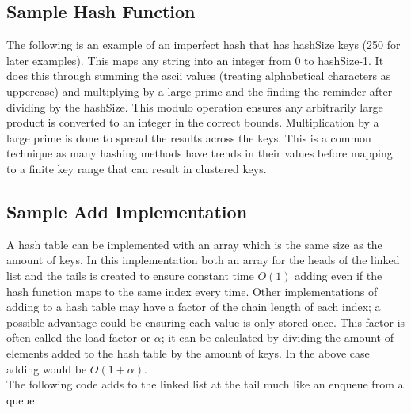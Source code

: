 \documentclass[letterpaper, 10pt]{article}
\begin{document}
\subsection{Sample Hash Function}
The following is an example of an imperfect hash that has hashSize keys (250 for later examples). This maps any string
into an integer from 0 to hashSize-1. It does this through summing the ascii values (treating alphabetical characters as uppercase)
and multiplying by a large prime and the finding the reminder after dividing by the hashSize. This modulo operation ensures any arbitrarily
large product is converted to an integer in the correct bounds. Multiplication by a large prime is done to spread the results across the keys.
This is a common technique as many hashing methods have trends in their values before mapping to a finite key range
that can result in clustered keys.


\subsection{Sample Add Implementation}
A hash table can be implemented with an array which is the same size as the amount of keys. In this implementation
both an array for the heads of the linked list and the tails is created to ensure constant time $O(1)$ adding even if
the hash function maps to the same index every time. Other implementations of adding to a hash table may have a 
factor of the chain length of each index; a possible advantage could be ensuring each value is only stored once.
This factor is often called the load factor or $\alpha$; it can
be calculated by dividing the amount of elements added to the hash table by the amount of keys.
In the above case adding would be $O(1 + \alpha)$. \\
\newline
\noindent
\newpage
The following code adds to the linked list at the tail much like an enqueue from a queue.


\end{document}

